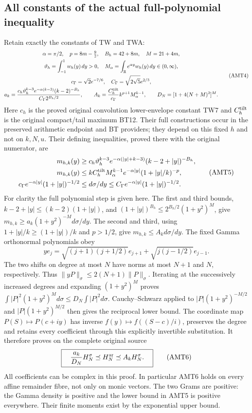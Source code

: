 \documentclass[11pt,a4paper]{article}
\begin{document}
\subsection{All constants of the actual full-polynomial inequality}
Retain exactly the constants of TW and TWA:
\[
\begin{gathered}
 \alpha=\pi/2,\quad p=8m-\tfrac92,\quad B_h=42+8m,\quad M=21+4m,\\
 \vartheta_h=\int_{-1}^1w_h(y)\,dy>0,\quad
 M_\alpha=\int_{\mathbb R}e^{\alpha y}w_h(y)\,dy\in(0,\infty),\\
 c_\Gamma=\sqrt2e^{-7/6},\quad C_\Gamma=\sqrt{2\sqrt5}e^{2/3},\\
 a_k=\frac{c_h\vartheta_h^{k-3}e^{-\alpha(k-3)}(k-2)^{-B_h}}
                   {C_\Gamma2^{B_h/2}},\qquad
 A_k=\frac{C_h^{\rm tilt}}{c_\Gamma}k^{p+1}M_\alpha^{k-1},\qquad
 D_N=[1+4(N+M)^2]^M.
\end{gathered}\tag{AMT4}
\]
Here $c_h$ is the proved original convolution lower-envelope constant
TW7 and $C_h^{\rm tilt}$ is the original compact/tail maximum BT12.
Their full constructions occur in the preserved arithmetic endpoint
and BT providers; they depend on this fixed $h$ and not on $k,N,u$.
Their defining inequalities, proved there with the original numerator,
are
\[
\begin{split}
 m_{h,k}(y)&\ge c_h\vartheta_h^{k-3}
    e^{-\alpha(|y|+k-3)}(k-2+|y|)^{-B_h},\\
 m_{h,k}(y)&\le k C_h^{\rm tilt}M_\alpha^{k-1}
              e^{-\alpha|y|}(1+|y|/k)^{-p},\\
 c_\Gamma e^{-\alpha|y|}(1+|y|)^{-1/2}
 &\le d\sigma/dy\le
 C_\Gamma e^{-\alpha|y|}(1+|y|)^{-1/2}.
\end{split}\tag{AMT5}
\]
For clarity the full polynomial step is given here. The first and
third bounds, $k-2+|y|\le(k-2)(1+|y|)$, and
$(1+|y|)^{B_h}\le2^{B_h/2}(1+y^2)^M$, give
$m_{h,k}\ge a_k(1+y^2)^{-M}d\sigma/dy$. The second and third,
using $1+|y|/k\ge(1+|y|)/k$ and $p>1/2$, give
$m_{h,k}\le A_kd\sigma/dy$.
The fixed Gamma orthonormal polynomials obey
\[
 ye_j=\sqrt{(j+1)(j+1/2)}e_{j+1}
                         +\sqrt{j(j-1/2)}e_{j-1}.
\]
The two shifts on degree at most $N$ have norms at most $N+1$ and
$N$, respectively. Thus $\|yP\|_\sigma\le2(N+1)\|P\|_\sigma$.
Iterating at the successively increased degrees and expanding
$(1+y^2)^M$ proves
$\int|P|^2(1+y^2)^M d\sigma\le D_N\int|P|^2d\sigma$.
Cauchy--Schwarz applied to $|P|(1+y^2)^{-M/2}$ and
$|P|(1+y^2)^{M/2}$ then gives the reciprocal lower bound. The
coordinate map $P(S)\mapsto P(c+iy)$ has inverse
$f(y)\mapsto f((S-c)/i)$, preserves the degree and retains every
coefficient through this explicitly invertible substitution. It
therefore proves on the complete original source
\[
 \boxed{\quad \frac{a_k}{D_N}H_N^\sigma
                  \preceq H_N^{\rm ar}\preceq A_kH_N^\sigma.\quad}
 \tag{AMT6}
\]
All coefficients can be complex in this proof. In particular AMT6
holds on every affine remainder fibre, not only on monic vectors.
The two Grams are positive: the Gamma density is positive and the
lower bound in AMT5 is positive everywhere. Their finite moments
exist by the exponential upper bound.
\end{document}
